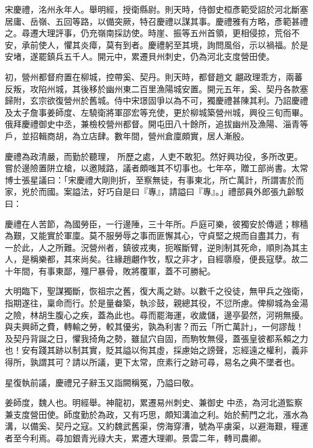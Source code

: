 \begin{pinyinscope}
 宋慶禮，洺州永年人。舉明經，授衛縣尉。則天時，侍御史桓彥範受詔於河北斷塞居庸、岳嶺、五回等路，以備突厥，特召慶禮以謀其事。慶禮雅有方略，彥範甚禮之。尋遷大理評事，仍充嶺南採訪使。時崖、振等五州首領，更相侵掠，荒俗不安，承前使人，懼其炎瘴，莫有到者。慶禮躬至其境，詢問風俗，示以禍福。於是安堵，遂罷鎮兵五千人。開元中，累遷貝州刺史，仍為河北支度營田使。



 初，營州都督府置在柳城，控帶奚、契丹。則天時，都督趙文
 翽政理乖方，兩蕃反叛，攻陷州城，其後移於幽州東二百里漁陽城安置。開元五年，奚、契丹各款塞歸附，玄宗欲復營州於舊城。侍中宋璟固爭以為不可，獨慶禮甚陳其利。乃詔慶禮及太子詹事姜師度、左驍衛將軍邵宏等充使，更於柳城築營州城，興役三旬而畢。俄拜慶禮御史中丞，兼檢校營州都督。開屯田八十餘所，追拔幽州及漁陽、淄青等戶，並招輯商胡，為立店肆。數年間，營州倉廩頗實，居人漸殷。



 慶禮為政清嚴，而勤於聽理，
 所歷之處，人吏不敢犯。然好興功役，多所改更。嘗於邊險置阱立槍，以邀賊路，議者頗嗤其不切事也。七年卒，贈工部尚書。太常博士張星議曰：「宋慶禮大剛則折，至察無徒，有事東北，所亡萬計，所謂害於而家，兇於而國。案謚法，好巧自是曰『專』，請謚曰『專』。」禮部員外郎張九齡駁曰：



 慶禮在人苦節，為國勞臣，一行邊陲，三十年所。戶庭可樂，彼獨安於傳遞；稼穡為艱，又能實於軍廩。莫不服勞辱之事而匪懈其心，守貞堅之規而自盡其力，有
 一於此，人之所難。況營州者，鎮彼戎夷，扼喉斷臂，逆則制其死命，順則為其主人，是稱樂都，其來尚矣。往緣趙翽作牧，馭之非才，自經隳廢，便長寇孽。故二十年間，有事東鄙，殭尸暴骨，敗將覆軍，蓋不可勝紀。



 大明臨下，聖謀獨斷，恢祖宗之舊，復大禹之跡。以數千之役徒，無甲兵之強衛，指期遂往，稟命而行。於是量畚築，執沴鼓，親總其役，不愆所慮。俾柳城為金湯之險，林胡生腹心之疾，蓋為此也。尋而罷海運，收歲儲，邊亭晏然，河朔無擾。
 與夫興師之費，轉輸之勞，較其優劣，孰為利害？而云「所亡萬計」，一何謬哉！及契丹背誕之日，懼我掎角之勢，雖鼠穴自固，而駒牧無侵，蓋張皇彼都系賴之力也！安有踐其跡以制其實，貶其謚以徇其虛，採慮始之謗聲，忘經遠之權利，義非得所，孰謂其可？請以所議，更下太常，庶素行之跡可尋，易名之典不墜者也。



 星復執前議，慶禮兄子辭玉又詣闕稱冤，乃謚曰敬。



 姜師度，魏人也。明經舉。神龍初，累遷易州刺史、兼御史
 中丞，為河北道監察兼支度營田使。師度勤於為政，又有巧思，頗知溝洫之利。始於薊門之北，漲水為溝，以備奚、契丹之寇。又約魏武舊渠，傍海穿漕，號為平虜渠，以避海艱，糧運者至今利焉。尋加銀青光祿大夫，累遷大理卿。景雲二年，轉司農卿。




\end{pinyinscope}

